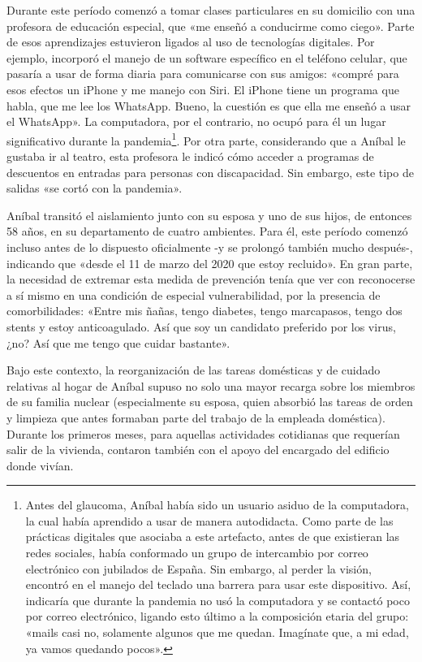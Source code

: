 Durante este período comenzó a tomar clases particulares en su domicilio con una profesora de educación especial, que «me enseñó a conducirme como ciego». Parte de esos aprendizajes estuvieron ligados al uso de tecnologías digitales. Por ejemplo, incorporó el manejo de un software específico en el teléfono celular, que pasaría a usar de forma diaria para comunicarse con sus amigos: «compré para esos efectos un iPhone y me manejo con Siri. El iPhone tiene un programa que habla, que me lee los WhatsApp. Bueno, la cuestión es que ella me enseñó a usar el WhatsApp». La computadora, por el contrario, no ocupó para él un lugar significativo durante la pandemia\footnote{Antes del glaucoma, Aníbal había sido un usuario asiduo de la computadora, la cual había aprendido a usar de manera autodidacta. Como parte de las prácticas digitales que asociaba a este artefacto, antes de que existieran las redes sociales, había conformado un grupo de intercambio por correo electrónico con jubilados de España. Sin embargo, al perder la visión, encontró en el manejo del teclado una barrera para usar este dispositivo. Así, indicaría que durante la pandemia no usó la computadora y se contactó poco por correo electrónico, ligando esto último a la composición etaria del grupo: «mails casi no, solamente algunos que me quedan. Imagínate que, a mi edad, ya vamos quedando pocos».}. Por otra parte, considerando que a Aníbal le gustaba ir al teatro, esta profesora le indicó cómo acceder a programas de descuentos en entradas para personas con discapacidad. Sin embargo, este tipo de salidas «se cortó con la pandemia».

Aníbal transitó el aislamiento junto con su esposa y uno de sus hijos, de entonces 58 años, en su departamento de cuatro ambientes. Para él, este período comenzó incluso antes de lo dispuesto oficialmente -y se prolongó también mucho después-, indicando que «desde el 11 de marzo del 2020 que estoy recluido». En gran parte, la necesidad de extremar esta medida de prevención tenía que ver con reconocerse a sí mismo en una condición de especial vulnerabilidad, por la presencia de comorbilidades: «Entre mis ñañas, tengo diabetes, tengo marcapasos, tengo dos stents y estoy anticoagulado. Así que soy un candidato preferido por los virus, ¿no? Así que me tengo que cuidar bastante».

Bajo este contexto, la reorganización de las tareas domésticas y de cuidado relativas al hogar de Aníbal supuso no solo una mayor recarga sobre los miembros de su familia nuclear (especialmente su esposa, quien absorbió las tareas de orden y limpieza que antes formaban parte del trabajo de la empleada doméstica). Durante los primeros meses, para aquellas actividades cotidianas que requerían salir de la vivienda, contaron también con el apoyo del encargado del edificio donde vivían.

